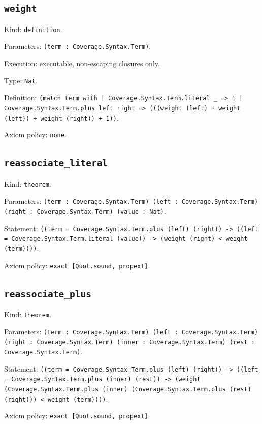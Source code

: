 \documentclass[11pt]{article}
\begin{document}
\subsection*{\texttt{weight}}
\noindent Kind: \texttt{definition}.\par
\noindent Parameters: \texttt{(term : Coverage.Syntax.Term)}.\par
\noindent Execution: executable, non-escaping closures only.\par
\noindent Type: \texttt{Nat}.\par
\noindent Definition: \texttt{(match term with | Coverage.Syntax.Term.literal \_ => 1 | Coverage.Syntax.Term.plus left right => (((weight (left) + weight (left)) + weight (right)) + 1))}.\par
\noindent Axiom policy: \texttt{none}.\par
\subsection*{\texttt{reassociate\_literal}}
\noindent Kind: \texttt{theorem}.\par
\noindent Parameters: \texttt{(term : Coverage.Syntax.Term) (left : Coverage.Syntax.Term) (right : Coverage.Syntax.Term) (value : Nat)}.\par
\noindent Statement: \texttt{((term = Coverage.Syntax.Term.plus (left) (right)) -> ((left = Coverage.Syntax.Term.literal (value)) -> (weight (right) < weight (term))))}.\par
\noindent Axiom policy: \texttt{exact [Quot.sound, propext]}.\par
\subsection*{\texttt{reassociate\_plus}}
\noindent Kind: \texttt{theorem}.\par
\noindent Parameters: \texttt{(term : Coverage.Syntax.Term) (left : Coverage.Syntax.Term) (right : Coverage.Syntax.Term) (inner : Coverage.Syntax.Term) (rest : Coverage.Syntax.Term)}.\par
\noindent Statement: \texttt{((term = Coverage.Syntax.Term.plus (left) (right)) -> ((left = Coverage.Syntax.Term.plus (inner) (rest)) -> (weight (Coverage.Syntax.Term.plus (inner) (Coverage.Syntax.Term.plus (rest) (right))) < weight (term))))}.\par
\noindent Axiom policy: \texttt{exact [Quot.sound, propext]}.\par
\end{document}
